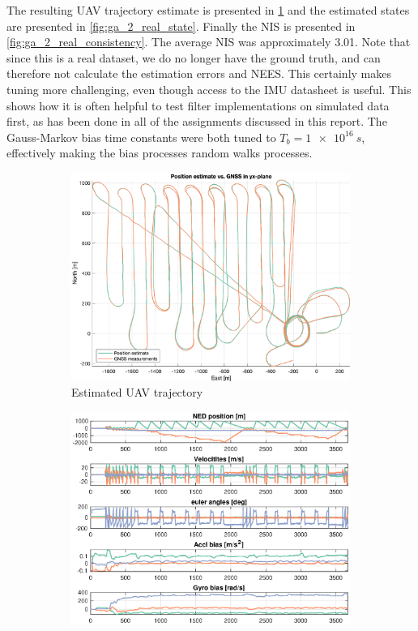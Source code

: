 The resulting UAV trajectory estimate is presented in \cref{fig:ga_2_real_trajectory} and the estimated states are presented in \cref{fig:ga_2_real_state}. Finally the NIS is presented in \cref{fig:ga_2_real_consistency}. The average NIS was approximately 3.01. Note that since this is a real dataset, we do no longer have the ground truth, and can therefore not calculate the estimation errors and NEES. This certainly makes tuning more challenging, even though access to the IMU datasheet is useful. This shows how it is often helpful to test filter implementations on simulated data first, as has been done in all of the assignments discussed in this report. The Gauss-Markov bias time constants were both tuned to $T_b = \SI{1e16}{s}$, effectively making the bias processes random walks processes.

\begin{figure}[ht]
    \centering
    \begin{subfigure}[b]{0.45\textwidth}
		\includegraphics[width=\textwidth]{figures/ga_2/real_trajectory.eps}
        \caption{Estimated UAV trajectory}
        \label{fig:ga_2_real_trajectory}
	\end{subfigure}%
    \begin{subfigure}[b]{0.45\textwidth}
		\includegraphics[width=\textwidth]{figures/ga_2/real_state.eps}

\end{subfigure}
\end{figure}
